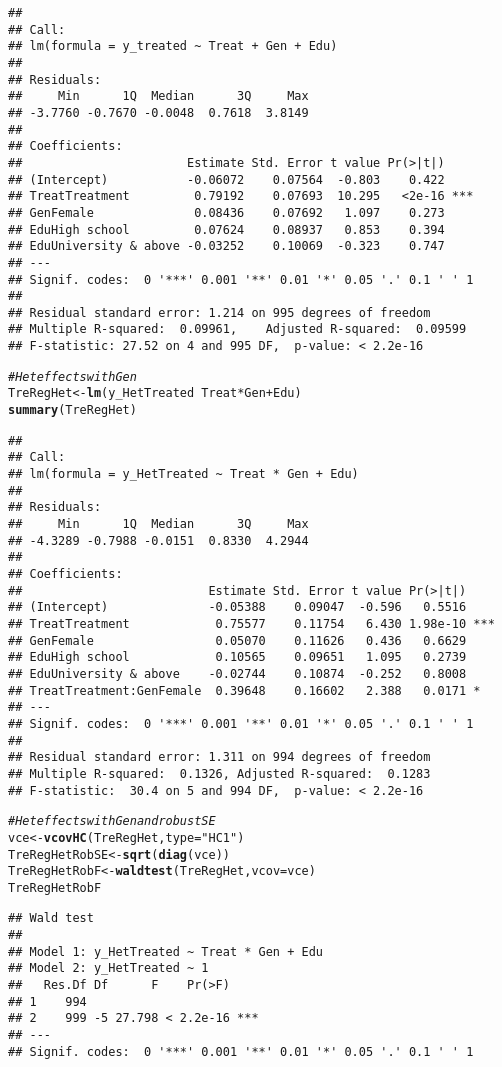 \documentclass[11pt, a4paper]{article}\usepackage[]{graphicx}\usepackage[]{color}
\makeatletter
\newcommand{\hlstr}[1]{\textcolor[rgb]{0.192,0.494,0.8}{#1}}%
\newcommand{\hlcom}[1]{\textcolor[rgb]{0.678,0.584,0.686}{\textit{#1}}}%
\newcommand{\hlopt}[1]{\textcolor[rgb]{0,0,0}{#1}}%
\newcommand{\hlstd}[1]{\textcolor[rgb]{0.345,0.345,0.345}{#1}}%
\newcommand{\hlkwb}[1]{\textcolor[rgb]{0.69,0.353,0.396}{#1}}%
\newcommand{\hlkwc}[1]{\textcolor[rgb]{0.333,0.667,0.333}{#1}}%
\newcommand{\hlkwd}[1]{\textcolor[rgb]{0.737,0.353,0.396}{\textbf{#1}}}%
\newenvironment{kframe}{%
 \def\at@end@of@kframe{}%
 \ifinner\ifhmode%
  \def\at@end@of@kframe{\end{minipage}}%
  \begin{minipage}{\columnwidth}%
 \fi\fi%
 \def\FrameCommand##1{\hskip\@totalleftmargin \hskip-\fboxsep
 \colorbox{shadecolor}{##1}\hskip-\fboxsep
     \hskip-\linewidth \hskip-\@totalleftmargin \hskip\columnwidth}%
 \MakeFramed {\advance\hsize-\width
   \@totalleftmargin\z@ \linewidth\hsize
   \@setminipage}}%
 {\par\unskip\endMakeFramed%
 \at@end@of@kframe}
\newenvironment{knitrout}{}{} %
\makeatother
\begin{document}
\begin{knitrout}
\begin{kframe}
\begin{alltt}
\end{alltt}
\begin{verbatim}
## 
## Call:
## lm(formula = y_treated ~ Treat + Gen + Edu)
## 
## Residuals:
##     Min      1Q  Median      3Q     Max 
## -3.7760 -0.7670 -0.0048  0.7618  3.8149 
## 
## Coefficients:
##                       Estimate Std. Error t value Pr(>|t|)    
## (Intercept)           -0.06072    0.07564  -0.803    0.422    
## TreatTreatment         0.79192    0.07693  10.295   <2e-16 ***
## GenFemale              0.08436    0.07692   1.097    0.273    
## EduHigh school         0.07624    0.08937   0.853    0.394    
## EduUniversity & above -0.03252    0.10069  -0.323    0.747    
## ---
## Signif. codes:  0 '***' 0.001 '**' 0.01 '*' 0.05 '.' 0.1 ' ' 1
## 
## Residual standard error: 1.214 on 995 degrees of freedom
## Multiple R-squared:  0.09961,	Adjusted R-squared:  0.09599 
## F-statistic: 27.52 on 4 and 995 DF,  p-value: < 2.2e-16
\end{verbatim}
\begin{alltt}
  \hlcom{#Het effects with Gen}
  \hlstd{TreRegHet} \hlkwb{<-} \hlkwd{lm}\hlstd{(y_HetTreated} \hlopt{~} \hlstd{Treat}\hlopt{*}\hlstd{Gen} \hlopt{+} \hlstd{Edu)}
  \hlkwd{summary}\hlstd{(TreRegHet)}
\end{alltt}
\begin{verbatim}
## 
## Call:
## lm(formula = y_HetTreated ~ Treat * Gen + Edu)
## 
## Residuals:
##     Min      1Q  Median      3Q     Max 
## -4.3289 -0.7988 -0.0151  0.8330  4.2944 
## 
## Coefficients:
##                          Estimate Std. Error t value Pr(>|t|)    
## (Intercept)              -0.05388    0.09047  -0.596   0.5516    
## TreatTreatment            0.75577    0.11754   6.430 1.98e-10 ***
## GenFemale                 0.05070    0.11626   0.436   0.6629    
## EduHigh school            0.10565    0.09651   1.095   0.2739    
## EduUniversity & above    -0.02744    0.10874  -0.252   0.8008    
## TreatTreatment:GenFemale  0.39648    0.16602   2.388   0.0171 *  
## ---
## Signif. codes:  0 '***' 0.001 '**' 0.01 '*' 0.05 '.' 0.1 ' ' 1
## 
## Residual standard error: 1.311 on 994 degrees of freedom
## Multiple R-squared:  0.1326,	Adjusted R-squared:  0.1283 
## F-statistic:  30.4 on 5 and 994 DF,  p-value: < 2.2e-16
\end{verbatim}
\begin{alltt}
  \hlcom{#Het effects with Gen and robust SE}
  \hlstd{vce} \hlkwb{<-} \hlkwd{vcovHC}\hlstd{(TreRegHet,} \hlkwc{type} \hlstd{=} \hlstr{"HC1"}\hlstd{)}
  \hlstd{TreRegHetRobSE} \hlkwb{<-} \hlkwd{sqrt}\hlstd{(}\hlkwd{diag}\hlstd{(vce))}
  \hlstd{TreRegHetRobF} \hlkwb{<-} \hlkwd{waldtest}\hlstd{(TreRegHet,} \hlkwc{vcov} \hlstd{= vce)}
  \hlstd{TreRegHetRobF}
\end{alltt}
\begin{verbatim}
## Wald test
## 
## Model 1: y_HetTreated ~ Treat * Gen + Edu
## Model 2: y_HetTreated ~ 1
##   Res.Df Df      F    Pr(>F)    
## 1    994                        
## 2    999 -5 27.798 < 2.2e-16 ***
## ---
## Signif. codes:  0 '***' 0.001 '**' 0.01 '*' 0.05 '.' 0.1 ' ' 1
\end{verbatim}
\end{kframe}
\end{knitrout}
\end{document}
